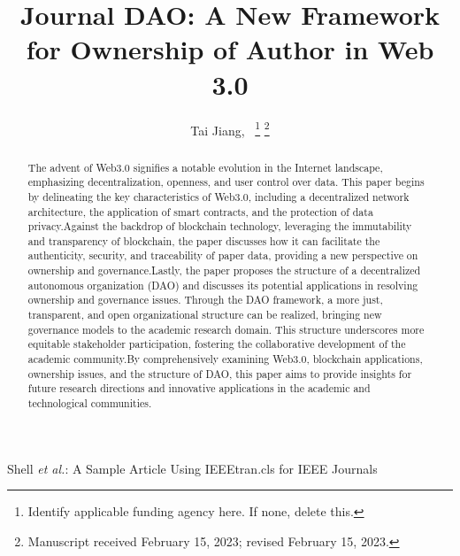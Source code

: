 \documentclass[lettersize,journal]{IEEEtran}
\begin{document}
\title{Journal DAO: A New Framework for Ownership of Author in Web 3.0}

\author{Tai Jiang,~
\thanks{Identify applicable funding agency here. If none, delete this.}%
\thanks{Manuscript received February 15, 2023; revised February 15, 2023.}}

%
{Shell \MakeLowercase{\textit{et al.}}: A Sample Article Using IEEEtran.cls for IEEE Journals}


\maketitle

\begin{abstract}
The advent of Web3.0 signifies a notable evolution in the Internet landscape, emphasizing decentralization, openness, and user control over data. This paper begins by delineating the key characteristics of Web3.0, including a decentralized network architecture, the application of smart contracts, and the protection of data privacy.Against the backdrop of blockchain technology, leveraging the immutability and transparency of blockchain, the paper discusses how it can facilitate the authenticity, security, and traceability of paper data, providing a new perspective on ownership and governance.Lastly, the paper proposes the structure of a decentralized autonomous organization (DAO) and discusses its potential applications in resolving ownership and governance issues. Through the DAO framework, a more just, transparent, and open organizational structure can be realized, bringing new governance models to the academic research domain. This structure underscores more equitable stakeholder participation, fostering the collaborative development of the academic community.By comprehensively examining Web3.0, blockchain applications, ownership issues, and the structure of DAO, this paper aims to provide insights for future research directions and innovative applications in the academic and technological communities.
\end{abstract}
\end{document}
